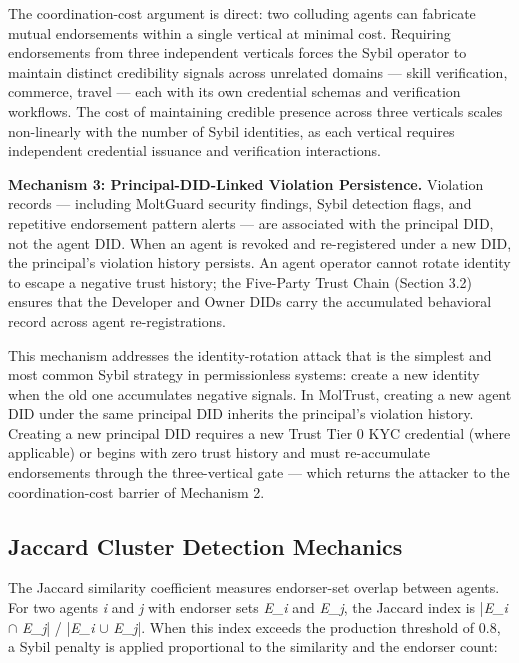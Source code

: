 The coordination-cost argument is direct: two colluding agents can fabricate mutual endorsements within a single vertical at minimal cost. Requiring endorsements from three independent verticals forces the Sybil operator to maintain distinct credibility signals across unrelated domains — skill verification, commerce, travel — each with its own credential schemas and verification workflows. The cost of maintaining credible presence across three verticals scales non-linearly with the number of Sybil identities, as each vertical requires independent credential issuance and verification interactions.


\textbf{Mechanism 3: Principal-DID-Linked Violation Persistence.} Violation records — including MoltGuard security findings, Sybil detection flags, and repetitive endorsement pattern alerts — are associated with the principal DID, not the agent DID. When an agent is revoked and re-registered under a new DID, the principal's violation history persists. An agent operator cannot rotate identity to escape a negative trust history; the Five-Party Trust Chain (Section 3.2) ensures that the Developer and Owner DIDs carry the accumulated behavioral record across agent re-registrations.


This mechanism addresses the identity-rotation attack that is the simplest and most common Sybil strategy in permissionless systems: create a new identity when the old one accumulates negative signals. In MolTrust, creating a new agent DID under the same principal DID inherits the principal's violation history. Creating a new principal DID requires a new Trust Tier 0 KYC credential (where applicable) or begins with zero trust history and must re-accumulate endorsements through the three-vertical gate — which returns the attacker to the coordination-cost barrier of Mechanism 2.


\subsection{Jaccard Cluster Detection Mechanics}

The Jaccard similarity coefficient measures endorser-set overlap between agents. For two agents \textit{i} and \textit{j} with endorser sets \textit{E\_i} and \textit{E\_j}, the Jaccard index is |\textit{E\_i} $\cap$ \textit{E\_j}| / |\textit{E\_i} $\cup$ \textit{E\_j}|. When this index exceeds the production threshold of 0.8, a Sybil penalty is applied proportional to the similarity and the endorser count:


